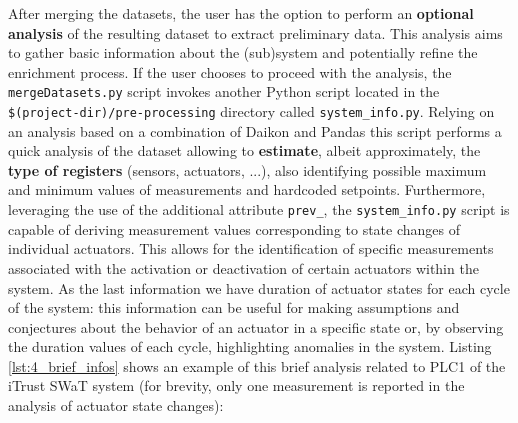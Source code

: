 After merging the datasets, the user has the option to perform an \textbf{optional analysis} of the resulting dataset to extract preliminary data. This analysis aims to gather basic information about the (sub)system and potentially refine the enrichment process. If the user chooses to proceed with the analysis, the \texttt{mergeDatasets.py} script invokes another Python script located in the \texttt{\$(project-dir)/pre-processing} directory called \texttt{system\_info.py}.\newline
Relying on an analysis based on a combination of Daikon and Pandas this script performs a quick analysis of the dataset allowing to \textbf{estimate}, albeit approximately, the \textbf{type of registers} (sensors, actuators, ...), also identifying possible maximum and minimum values of measurements and hardcoded setpoints. Furthermore, leveraging the use of the additional attribute \texttt{prev\_}, the \texttt{system\_info.py} script is capable of deriving measurement values corresponding to state changes of individual actuators. This allows for the identification of specific measurements associated with the activation or deactivation of certain actuators within the system.\newline
As the last information we have duration of actuator states for each cycle of the system: this information can be useful for making assumptions and conjectures about the behavior of an actuator in a specific state or, by observing the duration values of each cycle, highlighting anomalies in the system. \newline
Listing \ref{lst:4_brief_infos} shows an example of this brief analysis related to PLC1 of the iTrust SWaT system (for brevity, only one measurement is reported in the analysis of actuator state changes):

